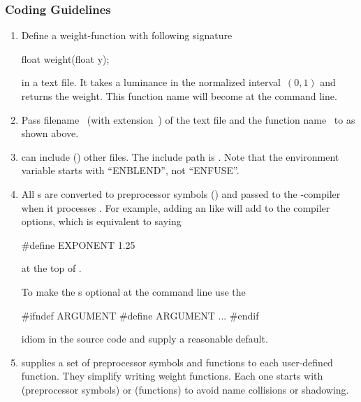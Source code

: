 \subsubsection[\acronym{OpenCL} Coding Guidelines]{\label{sec:opencl-coding-guidelines}%
   Coding Guidelines}

\begin{enumerate}
\item
  Define a weight-function with following signature
  \begin{cxxlisting}
float weight(float y);
  \end{cxxlisting}
  in a text file.  It takes a luminance in the normalized interval~$(0, 1)$ and returns the
  weight.  This function name will become  at the \App{} command line.

\item
  Pass filename~ (with extension~) of the text file and the
  function name~ to \App{} as shown above.

\item
   can include () other files.  The include path
  is .  Note that the environment variable starts with
  ``ENBLEND'', not ``ENFUSE''.

\item\sloppypar
  All s are converted to preprocessor symbols () and
  passed to the -compiler when it processes .  For
  example, adding an  like  will add
   to the compiler options, which is equivalent to saying
  \begin{cxxlisting}
#define EXPONENT 1.25
  \end{cxxlisting}
  at the top of .

  To make the s optional at the \app{} command line use the
  \begin{cxxlisting}
#ifndef ARGUMENT
#define ARGUMENT ...
#endif
  \end{cxxlisting}
  idiom in the source code and supply a reasonable default.

\item
  \App{} supplies a set of preprocessor symbols and functions to each user-defined function.
  They simplify writing weight functions.  Each one starts with  (preprocessor
  symbols) or  (functions) to avoid name collisions or shadowing.


\end{enumerate}
